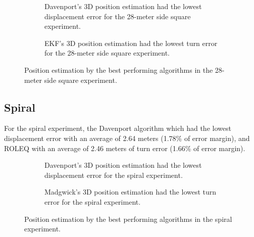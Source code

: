 \begin{figure}[H]
    \centering
    \begin{subfigure}{0.49\textwidth}
        \centering
        \resizebox{1\linewidth}{!}{}
        \caption{Davenport's 3D position estimation had the lowest displacement error for the 28-meter side square experiment.}
        \label{fig:square282D}
    \end{subfigure}
    \begin{subfigure}{0.49\textwidth}
        \centering
        \resizebox{1\linewidth}{!}{}
        \caption{EKF's 3D position estimation had the lowest turn error for the 28-meter  side square experiment.}
        \label{fig:square283D}
    \end{subfigure}
    \caption{Position estimation by the best performing algorithms in the 28-meter side square experiment.}
    \label{fig:square28}
\end{figure}

\subsection{Spiral}

For the spiral experiment, the Davenport algorithm which had the lowest displacement error with an average of 2.64 meters (1.78\% of error margin), and ROLEQ with an average of 2.46 meters of turn error (1.66\% of error margin).

\vspace{-0.5cm}

\vspace{-1.5cm}

\begin{figure}[H]
    \centering
    \begin{subfigure}{0.49\textwidth}
        \centering
        \resizebox{1\linewidth}{!}{}
        \caption{Davenport's 3D position estimation had the lowest displacement error for the spiral experiment.}
        \label{fig:spiral2D}
    \end{subfigure}
    \begin{subfigure}{0.49\textwidth}
        \centering
        \resizebox{1\linewidth}{!}{}
        \caption{Madgwick's 3D position estimation had the lowest turn error for the spiral experiment.}
        \label{fig:spiral3D}
    \end{subfigure}
    \caption{Position estimation by the best performing algorithms in the spiral experiment.}
    \label{fig:spiral}
\end{figure}

